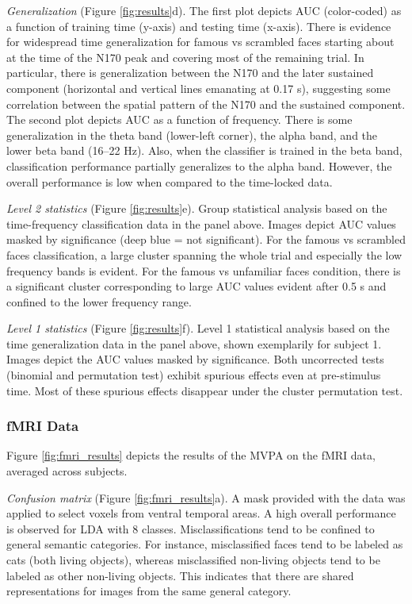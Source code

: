 \documentclass[utf8]{frontiersSCNS} %
\begin{document}
\textit{Generalization} (Figure \ref{fig:results}d). The first plot depicts AUC (color-coded) as a function of training time (y-axis) and testing time (x-axis). There is evidence for widespread time generalization for famous vs scrambled faces starting about at the time of the N170 peak and covering most of the remaining trial. In particular, there is generalization between the N170 and the later sustained component (horizontal and vertical lines emanating at 0.17 s), suggesting some correlation between the spatial pattern of the N170 and the sustained component.
The second plot depicts AUC as a function of frequency. There is some generalization in the theta band (lower-left corner), the alpha band, and the lower beta band (16--22 Hz). Also, when the classifier is trained in the beta band, classification performance partially generalizes to the alpha band. However, the overall performance is low when compared to the time-locked data.

\textit{Level 2 statistics} (Figure \ref{fig:results}e). Group statistical analysis  based on the time-frequency classification data in the panel above. Images depict AUC values masked by significance (deep blue = not significant). For the famous vs scrambled faces classification, a large cluster spanning the whole trial and especially the low frequency bands is evident. For the famous vs unfamiliar faces condition, there is a significant cluster corresponding to large AUC values evident after 0.5 s and confined to the lower frequency range.

\textit{Level 1 statistics} (Figure \ref{fig:results}f). Level 1 statistical analysis based on the time generalization data in the panel above, shown exemplarily for subject 1. Images depict the AUC values masked by significance. Both uncorrected tests (binomial and permutation test) exhibit spurious effects even at pre-stimulus time. Most of these spurious effects disappear under the cluster permutation test.

\subsubsection{fMRI Data}

Figure \ref{fig:fmri_results} depicts the results of the MVPA on the fMRI data, averaged across subjects.

\textit{Confusion matrix} (Figure \ref{fig:fmri_results}a). A mask provided with the data was applied to select voxels from ventral temporal areas.
A high overall performance is observed for LDA with 8 classes. Misclassifications tend to be confined to general semantic categories. For instance, misclassified faces tend to be labeled as cats (both living objects), whereas misclassified non-living objects tend to be labeled as other non-living objects. This indicates that there are shared representations for images from the same general category.
\end{document}
